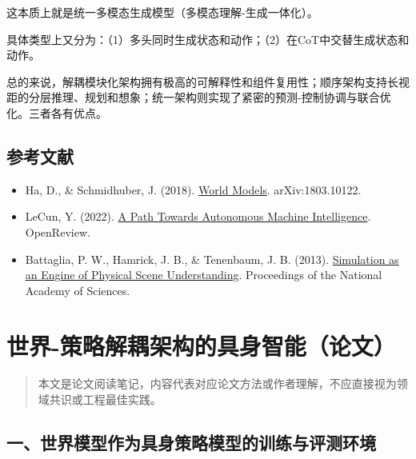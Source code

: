 这本质上就是统一多模态生成模型（多模态理解-生成一体化）。

具体类型上又分为：（1）多头同时生成状态和动作；（2）在CoT中交替生成状态和动作。

总的来说，解耦模块化架构拥有极高的可解释性和组件复用性；顺序架构支持长视距的分层推理、规划和想象；统一架构则实现了紧密的预测-控制协调与联合优化。三者各有优点。

\hypertarget{ux53c2ux8003ux6587ux732e-200}{%
\subsection{参考文献}\label{ux53c2ux8003ux6587ux732e-200}}

\begin{itemize}
\tightlist
\item
  Ha, D., \& Schmidhuber, J. (2018). \href{https://arxiv.org/abs/1803.10122}{World Models}. arXiv:1803.10122.
\item
  LeCun, Y. (2022). \href{https://openreview.net/forum?id=BZ5a1r-kVsf}{A Path Towards Autonomous Machine Intelligence}. OpenReview.
\item
  Battaglia, P. W., Hamrick, J. B., \& Tenenbaum, J. B. (2013). \href{https://www.pnas.org/doi/10.1073/pnas.1306572110}{Simulation as an Engine of Physical Scene Understanding}. Proceedings of the National Academy of Sciences.
\end{itemize}

\clearpage

\hypertarget{ux4e16ux754c-ux7b56ux7565ux89e3ux8026ux67b6ux6784ux7684ux5177ux8eabux667aux80fdux8bbaux6587}{%
\section{世界-策略解耦架构的具身智能（论文）}\label{ux4e16ux754c-ux7b56ux7565ux89e3ux8026ux67b6ux6784ux7684ux5177ux8eabux667aux80fdux8bbaux6587}}

\begin{quote}
本文是论文阅读笔记，内容代表对应论文方法或作者理解，不应直接视为领域共识或工程最佳实践。
\end{quote}

\hypertarget{ux4e00ux4e16ux754cux6a21ux578bux4f5cux4e3aux5177ux8eabux7b56ux7565ux6a21ux578bux7684ux8badux7ec3ux4e0eux8bc4ux6d4bux73afux5883}{%
\subsection{一、世界模型作为具身策略模型的训练与评测环境}\label{ux4e00ux4e16ux754cux6a21ux578bux4f5cux4e3aux5177ux8eabux7b56ux7565ux6a21ux578bux7684ux8badux7ec3ux4e0eux8bc4ux6d4bux73afux5883}}

